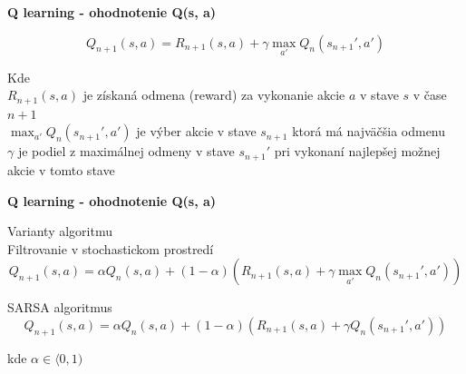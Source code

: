 \documentclass[xcolor=dvipsnames]{beamer}
\begin{document}
\begin{frame}{\bf Q learning - ohodnotenie Q(s, a)}

\begin{equation}
\label{q_learning}
   Q_{n+1}(s, a) = R_{n+1}(s, a) + \gamma \max_{a'} Q_n(s_{n+1}', a')
\end{equation}

Kde \\
$R_{n+1}(s, a)$ je získaná odmena (reward) za vykonanie akcie $a$ v stave $s$ v čase
$n+1$ \\
\bigskip
$\max_{a'} Q_n(s_{n+1}', a')$ je výber akcie v stave $s_{n+1}$ ktorá má najväčšia odmenu \\
\bigskip
$\gamma$ je podiel z maximálnej odmeny v stave $s_{n+1}'$ pri vykonaní najlepšej
možnej akcie v tomto stave \\

\end{frame}


\begin{frame}{\bf Q learning - ohodnotenie Q(s, a)}

Varianty algoritmu \\

Filtrovanie v stochastickom prostredí
\begin{equation}
\label{q_learning}
   Q_{n+1}(s, a) = \alpha Q_{n}(s, a) + (1-\alpha) ( R_{n+1}(s, a) + \gamma \max_{a'} Q_n(s_{n+1}', a') ) \nonumber
\end{equation}

SARSA algoritmus
\begin{equation}
\label{q_learning}
   Q_{n+1}(s, a) = \alpha Q_{n}(s, a) + (1-\alpha) ( R_{n+1}(s, a) + \gamma Q_n(s_{n+1}', a') ) \nonumber
\end{equation}

\bigskip
kde $\alpha \in \langle 0, 1) $ \\

\end{frame}
\end{document}
